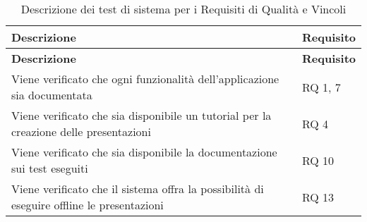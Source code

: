 {{		\renewcommand*{\arraystretch}{1.4}
		\begin{longtable} [c]{| p{7cm} |p{4cm}|}
			\caption{
			Descrizione dei test di sistema
			per i Requisiti di Qualità e Vincoli \label{tab:verReqQualVinc}}\\
			 \hline
			 \textbf{Descrizione} & \textbf{Requisito} \\
			 \hline
			 \endfirsthead
			 \hline
			 \textbf{Descrizione} & \textbf{Requisito} \\
			 \hline
			\endhead
			 \hline
			 \endfoot
			 \hline
			 \endlastfoot
			Viene verificato che ogni funzionalità dell'applicazione sia documentata & RQ 1, 7\\
			\hline
			Viene verificato che sia disponibile un tutorial per la creazione delle presentazioni & RQ 4\\
			\hline
			Viene verificato che sia disponibile la documentazione sui test eseguiti & RQ 10\\
			\hline
			Viene verificato che il sistema offra la possibilità di eseguire offline le presentazioni & RQ 13\\
\end{longtable}
}
}
